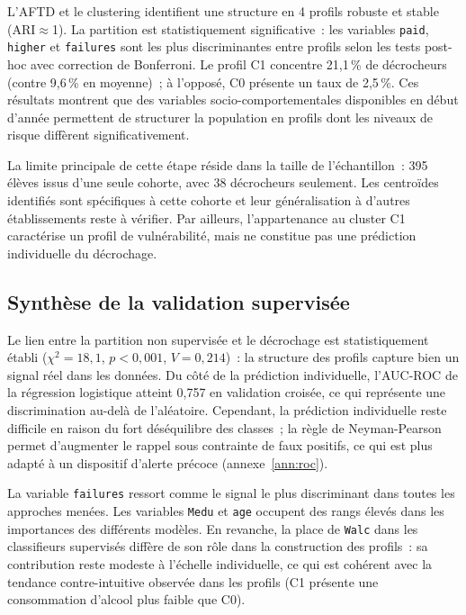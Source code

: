 \documentclass[twocolumn]{article}
\begin{document}
L'AFTD et le clustering identifient une structure en 4 profils robuste et stable (ARI$\approx$1). La partition est statistiquement significative~: les variables \texttt{paid}, \texttt{higher} et \texttt{failures} sont les plus discriminantes entre profils selon les tests post-hoc avec correction de Bonferroni. Le profil C1 concentre 21,1\,\% de décrocheurs (contre 9,6\,\% en moyenne)~; à l'opposé, C0 présente un taux de 2,5\,\%. Ces résultats montrent que des variables socio-comportementales disponibles en début d'année permettent de structurer la population en profils dont les niveaux de risque diffèrent significativement.

La limite principale de cette étape réside dans la taille de l'échantillon~: 395 élèves issus d'une seule cohorte, avec 38 décrocheurs seulement. Les centroïdes identifiés sont spécifiques à cette cohorte et leur généralisation à d'autres établissements reste à vérifier. Par ailleurs, l'appartenance au cluster C1 caractérise un profil de vulnérabilité, mais ne constitue pas une prédiction individuelle du décrochage.

\subsection{Synthèse de la validation supervisée}

Le lien entre la partition non supervisée et le décrochage est statistiquement établi ($\chi^2 = 18{,}1$, $p < 0{,}001$, $V = 0{,}214$)~: la structure des profils capture bien un signal réel dans les données. Du côté de la prédiction individuelle, l'AUC-ROC de la régression logistique atteint 0,757 en validation croisée, ce qui représente une discrimination au-delà de l'aléatoire. Cependant, la prédiction individuelle reste difficile en raison du fort déséquilibre des classes~; la règle de Neyman-Pearson permet d'augmenter le rappel sous contrainte de faux positifs, ce qui est plus adapté à un dispositif d'alerte précoce (annexe~\ref{ann:roc}).

La variable \texttt{failures} ressort comme le signal le plus discriminant dans toutes les approches menées. Les variables \texttt{Medu} et \texttt{age} occupent des rangs élevés dans les importances des différents modèles. En revanche, la place de \texttt{Walc} dans les classifieurs supervisés diffère de son rôle dans la construction des profils~: sa contribution reste modeste à l'échelle individuelle, ce qui est cohérent avec la tendance contre-intuitive observée dans les profils (C1 présente une consommation d'alcool plus faible que C0).
\end{document}
